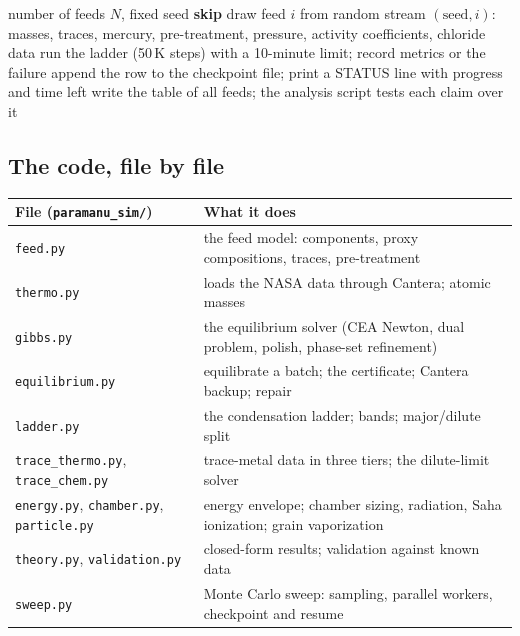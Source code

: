 \documentclass[11pt,a4paper]{article}
\begin{document}
\begin{algorithm}[H]
\caption{The Monte Carlo sweep (\texttt{sweep.run} and \texttt{06\_sweep.py})}
\begin{algorithmic}[1]
\Require number of feeds $N$, fixed seed
   \textbf{skip} \EndIf
  \State draw feed $i$ from random stream $(\text{seed}, i)$: masses, traces, mercury, pre-treatment, pressure, activity coefficients, chloride data
  \State run the ladder (50\,K steps) with a 10-minute limit; record metrics or the failure
  \State append the row to the checkpoint file; print a STATUS line with progress and time left
\EndFor
\State write the table of all feeds; the analysis script tests each claim over it
\end{algorithmic}
\end{algorithm}

\subsection{The code, file by file}
\begin{center}
\small
\begin{tabular}{@{}>{\raggedright\arraybackslash}p{3.6cm}>{\raggedright\arraybackslash}p{11cm}@{}}
\toprule
\textbf{File (\texttt{paramanu\_sim/})} & \textbf{What it does} \\
\midrule
\texttt{feed.py} & the feed model: components, proxy compositions, traces, pre-treatment \\
\texttt{thermo.py} & loads the NASA data through Cantera; atomic masses \\
\texttt{gibbs.py} & the equilibrium solver (CEA Newton, dual problem, polish, phase-set refinement) \\
\texttt{equilibrium.py} & equilibrate a batch; the certificate; Cantera backup; repair \\
\texttt{ladder.py} & the condensation ladder; bands; major/dilute split \\
\texttt{trace\_thermo.py}, \texttt{trace\_chem.py} & trace-metal data in three tiers; the dilute-limit solver \\
\texttt{energy.py}, \texttt{chamber.py}, \texttt{particle.py} & energy envelope; chamber sizing, radiation, Saha ionization; grain vaporization \\
\texttt{theory.py}, \texttt{validation.py} & closed-form results; validation against known data \\
\texttt{sweep.py} & Monte Carlo sweep: sampling, parallel workers, checkpoint and resume \\
\bottomrule
\end{tabular}
\end{center}
\end{document}
